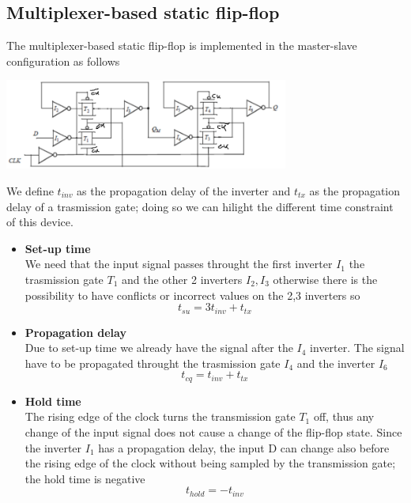 \subsection{Multiplexer-based static flip-flop}

The multiplexer-based static flip-flop is implemented in the master-slave configuration as follows

\centering
\includegraphics[width=0.7\textwidth]{C10_11.png}\\
\raggedright

We define $t_{inv}$ as the propagation delay of the inverter and $t_{tx}$ as the propagation delay of a trasmission gate; doing so we can hilight the different time constraint of this device.\\

\begin{itemize}

\item 
{\bf Set-up time}\\
We need that the input signal passes throught the first inverter $I_1$ the trasmission gate $T_1$ and the other 2 inverters $I_2,I_3$ otherwise there is the possibility to have conflicts or incorrect values on the 2,3 inverters so
\begin{equation}
t_{su}=3t_{inv}+t_{tx}
\end{equation}

\item 
{\bf Propagation delay}\\
Due to set-up time we already have the signal after the $I_4$ inverter. The signal have to be propagated throught the trasmission gate $I_4$ and the inverter $I_6$
\begin{equation}
t_{cq}=t_{inv}+t_{tx}
\end{equation}

\item
{\bf Hold time}\\
The rising edge of the clock turns the transmission gate $T_1$ off, thus any change of the input signal does not cause a change of the flip-flop state.
Since the inverter $I_1$ has a propagation delay, the input D can change also before the rising edge of the clock without being sampled by the transmission gate; the hold time is negative
\begin{equation}
t_{hold}=-t_{inv}
\end{equation}

\end{itemize}


